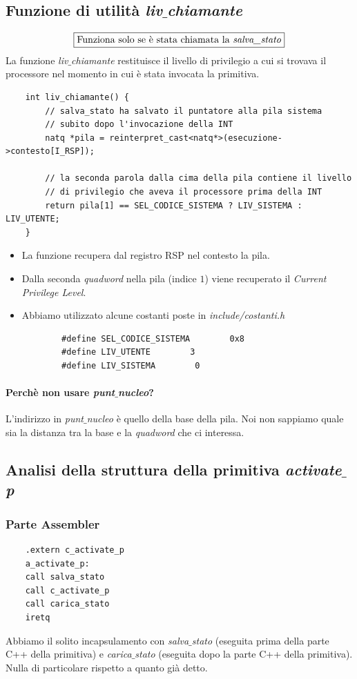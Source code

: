 \subsection{Funzione di utilità \emph{liv$\_$chiamante}}
\[\boxed{\text{Funziona solo se è stata chiamata la \emph{salva$\_$stato}}}\]
La funzione \emph{liv$\_$chiamante} restituisce il livello di privilegio a cui si trovava il processore nel momento in cui è stata invocata la primitiva.
\small 
\begin{verbatim}
	int liv_chiamante() {
		// salva_stato ha salvato il puntatore alla pila sistema
		// subito dopo l'invocazione della INT
		natq *pila = reinterpret_cast<natq*>(esecuzione->contesto[I_RSP]);
		
		// la seconda parola dalla cima della pila contiene il livello
		// di privilegio che aveva il processore prima della INT
		return pila[1] == SEL_CODICE_SISTEMA ? LIV_SISTEMA : LIV_UTENTE;
	}
\end{verbatim}
\normalsize
\begin{itemize}
	\item La funzione recupera dal registro RSP nel contesto la pila.
	\item Dalla seconda \emph{quadword} nella pila (indice $1$) viene recuperato il \emph{Current Privilege Level}.
	\item Abbiamo utilizzato alcune costanti poste in \emph{include/costanti.h}
	\begin{verbatim}
		#define SEL_CODICE_SISTEMA        0x8
		#define LIV_UTENTE        3
		#define LIV_SISTEMA        0
	\end{verbatim}
\end{itemize}
\paragraph{Perchè non usare \emph{punt$\_$nucleo}?} L'indirizzo in \emph{punt$\_$nucleo} è quello della base della pila. Noi non sappiamo quale sia la distanza tra la base e la \emph{quadword} che ci interessa.
\subsection{Analisi della struttura della primitiva \emph{activate$\_$p}}
\subsubsection{Parte Assembler}
\small 
\begin{verbatim}
	.extern c_activate_p
	a_activate_p:
	call salva_stato
	call c_activate_p
	call carica_stato
	iretq
\end{verbatim}
\normalsize 
Abbiamo il solito incapsulamento con \emph{salva$\_$stato} (eseguita prima della parte C++ della primitiva) e \emph{carica$\_$stato} (eseguita dopo la parte C++ della primitiva). Nulla di particolare rispetto a quanto già detto.
